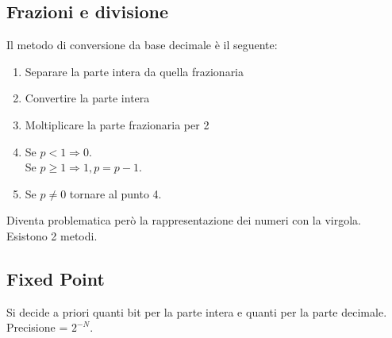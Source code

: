 \documentclass{report}
\begin{document}
    \subsection{Frazioni e divisione}
    Il metodo di conversione da base decimale è il seguente:
    \begin{enumerate}
            \item Separare la parte intera da quella frazionaria
            \item Convertire la parte intera
            \item Moltiplicare la parte frazionaria per 2
            \item Se $p < 1 \Longrightarrow 0$. \\
                Se $p \geq 1 \Longrightarrow 1, p = p - 1$.
            \item Se $p \neq 0$ tornare al punto 4.
    \end{enumerate} 
    Diventa problematica però la rappresentazione dei numeri con la virgola. \\
    Esistono 2 metodi.
    \subsection{Fixed Point}
        Si decide a priori quanti bit per la parte intera e quanti per la parte decimale. \\
        Precisione = $2^{-N}$.
\end{document}
